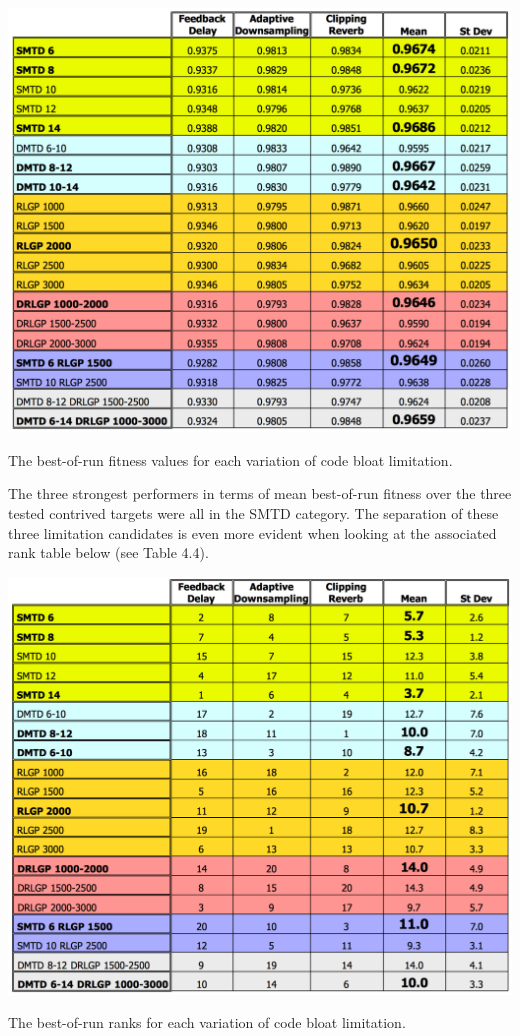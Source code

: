 \documentclass[a4paper,12pt]{report} 	%
\numberwithin{figure}{chapter}
\numberwithin{table}{chapter}
\numberwithin{equation}{chapter}
\begin{document}
\begin{flushleft}
\begin{table}[h!]
\begin{center}
\includegraphics[scale=0.6,width=\linewidth]{ResourceLimTable1}
\caption[Code Bloat Limitation Best-of-Run Values]{The best-of-run fitness values for each variation of code bloat limitation.}
\end{center}
\end{table}

The three strongest performers in terms of mean best-of-run fitness over the three tested contrived targets were all in the SMTD category. The separation of these three limitation candidates is even more evident when looking at the associated rank table below (see Table 4.4).

\begin{table}[h!]
\begin{center}
\includegraphics[scale=0.6,width=\linewidth]{ResourceLimTable2}
\caption[Code Bloat Limitation Best-of-Run Ranks]{The best-of-run ranks for each variation of code bloat limitation.}
\end{center}
\end{table}


\end{flushleft}
\end{document}
